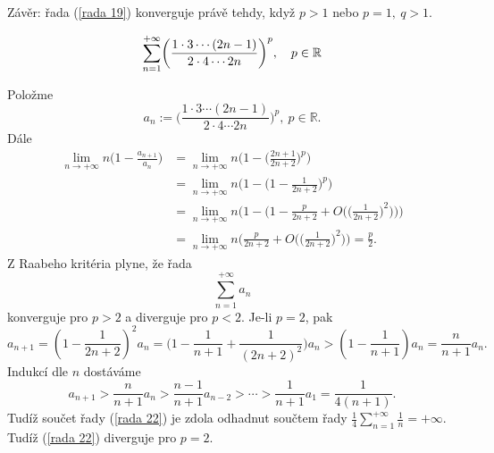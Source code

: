 \documentclass[answers]{exam}
\let\originalleft\left
\let\originalright\right
\renewcommand{\left}{\mathopen{}\mathclose\bgroup\originalleft}
\renewcommand{\right}{\aftergroup\egroup\originalright}
\begin{document}
\begin{questions}
\begin{solution}
		Z\'av\v er: \v rada (\ref{rada 19}) konverguje pr\'av\v e tehdy, kdy\v z $p>1$ nebo $p=1,\ q>1$.
  \end{solution}
  
  \question
  \begin{equation*}
    \sum_{n = 1}^{+\infty}
		\left( \frac{1 \cdot 3 \cdots \left( 2n - 1 \right)}{2 \cdot 4 \cdots 2n} \right)^p,
		\quad
		p \in \mathbb{R}
  \end{equation*}
  
  \begin{solution}
	Polo\v zme 
	$$a_n:=\bigg(\frac{1\cdot3\cdots(2n-1)}{2\cdot4\cdots2n}\bigg)^p,\ p\in\mathbb R.$$
	D\'ale
	\begin{align*}
		\lim\limits_{n\to+\infty}n\bigg(1-\frac{a_{n+1}}{a_n}\bigg)&=\lim\limits_{n\to+\infty}n\bigg(1-\bigg(\frac{2n+1}{2n+2}\bigg)^p\bigg)\\
		&=\lim\limits_{n\to+\infty}n\bigg(1-\bigg(1-\frac{1}{2n+2}\bigg)^p\bigg)\\
		&=\lim\limits_{n\to+\infty}n\bigg(1-\bigg(1-\frac{p}{2n+2}+O\bigg(\big(\frac{1}{2n+2}\big)^2\bigg)\bigg)\bigg)\\
		&=\lim\limits_{n\to+\infty}n\bigg(\frac{p}{2n+2}+O\bigg(\big(\frac{1}{2n+2}\big)^2\bigg)\bigg)=\frac{p}{2}.
	\end{align*}
	Z Raabeho krit\'eria plyne, \v ze \v rada 
	\begin{equation}\label{rada 22}
		\sum_{n=1}^{+\infty}a_n 
	\end{equation}
	konverguje pro $p>2$ a diverguje pro $p<2$. Je-li $p=2$, pak 
	$$a_{n+1}=(1-\frac{1}{2n+2})^2a_n=\big(1-\frac{1}{n+1}+\frac{1}{(2n+2)^2}\big)a_n>(1-\frac{1}{n+1})a_n=\frac{n}{n+1}a_n.$$
	Indukc\'i dle $n$ dost\'av\'ame 
	$$a_{n+1}>\frac{n}{n+1}a_n>\frac{n-1}{n+1}a_{n-2}>\cdots>\frac{1}{n+1}a_1=\frac{1}{4(n+1)}.$$
	Tud\'i\v z sou\v cet \v rady (\ref{rada 22}) je zdola odhadnut sou\v ctem \v rady $\frac{1}{4}\sum_{n=1}^{+\infty}\frac{1}{n}=+\infty$. Tud\'i\v z (\ref{rada 22}) diverguje pro $p=2$.  
  \end{solution}
   
\end{questions}
\end{document}
